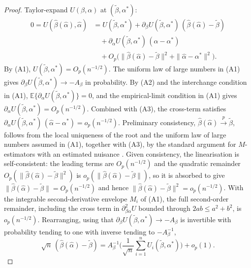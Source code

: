 \begin{proof}
Taylor-expand $U(\beta,\alpha)$ at $(\tilde\beta,\alpha^*)$:
\begin{align*}
0 = U(\hat\beta(\hat\alpha),\hat\alpha)
&= U(\tilde\beta, \alpha^*)
+ \partial_\beta U(\tilde\beta, \alpha^*)\,(\hat\beta(\hat\alpha) - \tilde\beta) \\
&\quad + \partial_\alpha U(\tilde\beta, \alpha^*)\,(\hat\alpha - \alpha^*) \\
&\quad + O_p\!\big(\|\hat\beta(\hat\alpha) - \tilde\beta\|^2 + \|\hat\alpha - \alpha^*\|^2\big).
\end{align*}
By (A1), $U(\tilde\beta, \alpha^*)=O_p(n^{-1/2})$. The uniform law of large numbers in (A1) gives $\partial_\beta U(\tilde\beta, \alpha^*) \to -A_\beta$ in probability. By (A2) and the interchange condition in (A1), $\mathbb{E}\{\partial_\alpha U(\tilde\beta,\alpha^*)\}=0$, and the empirical-limit condition in (A1) gives $\partial_\alpha U(\tilde\beta,\alpha^*)=O_p(n^{-1/2})$. Combined with (A3), the cross-term satisfies $\partial_\alpha U(\tilde\beta,\alpha^*)\,(\hat\alpha-\alpha^*)=o_p(n^{-1/2})$. Preliminary consistency, $\hat\beta(\hat\alpha)\xrightarrow{p}\tilde\beta$, follows from the local uniqueness of the root and the uniform law of large numbers assumed in (A1), together with (A3), by the standard argument for $M$-estimators with an estimated nuisance \citep{newey1994large}. Given consistency, the linearisation is self-consistent: the leading terms are $O_p(n^{-1/2})$ and the quadratic remainder $O_p(\lVert\hat\beta(\hat\alpha)-\tilde\beta\rVert^2)$ is $o_p(\lVert\hat\beta(\hat\alpha)-\tilde\beta\rVert)$, so it is absorbed to give $\lVert\hat\beta(\hat\alpha)-\tilde\beta\rVert=O_p(n^{-1/2})$ and hence $\lVert\hat\beta(\hat\alpha)-\tilde\beta\rVert^2=o_p(n^{-1/2})$. With the integrable second-derivative envelope $M_i$ of (A1), the full second-order remainder, including the cross term in $\partial^2_{\beta\alpha}U$ bounded through $2ab\le a^2+b^2$, is $o_p(n^{-1/2})$. Rearranging, using that $\partial_\beta U(\tilde\beta,\alpha^*)\to-A_\beta$ is invertible with probability tending to one with inverse tending to $-A_\beta^{-1}$,
\[
\sqrt{n}\,(\hat\beta(\hat\alpha)-\tilde\beta) = A_\beta^{-1}\Big(\frac{1}{\sqrt{n}}\sum_{i=1}^n U_i(\tilde\beta,\alpha^*)\Big) + o_p(1).
\]
\end{proof}

